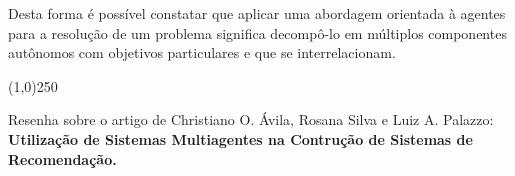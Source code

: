 \documentclass[11pt]{article}
\begin{document}
  Desta forma é possível constatar que aplicar uma abordagem orientada à agentes para a
  resolução de um problema significa decompô-lo em múltiplos componentes autônomos
  com objetivos particulares e que se interrelacionam.
  \\

  \begin{center}
  \line(1,0){250}
  \end{center}

  Resenha sobre o artigo de Christiano O. Ávila, Rosana Silva e Luiz 
  A. Palazzo: {\bf Utilização de Sistemas Multiagentes na Contrução de Sistemas de Recomendação.}
\end{document}
